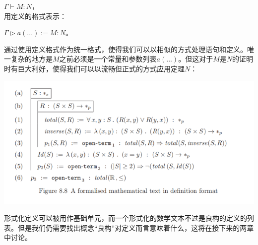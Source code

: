 \documentclass[UTF8]{article}
\begin{document}
		$\Gamma\vdash M:N$，\\
		用定义的格式表示：
		
		$\Gamma\triangleright a(...):=M:N$。
	
		通过使用定义格式作为统一格式，使得我们可以以相似的方式处理语句和定义。唯一复杂的地方是$M$之前必须是一个常量和参数列表$a(...)$。但这对于$M$是$N$的证明时有巨大利好，使得我们可以以流畅但正式的方式应用定理$N$：
		
		\noindent
		\includegraphics[width=0.93\linewidth]{"../imgs/8-6.png"}
		
		形式化定义可以被用作基础单元，而一个形式化的数学文本不过是良构的定义的列表。但是我们仍需要找出概念“良构”对定义而言意味着什么，这将在接下来的两章中讨论。
\end{document}
